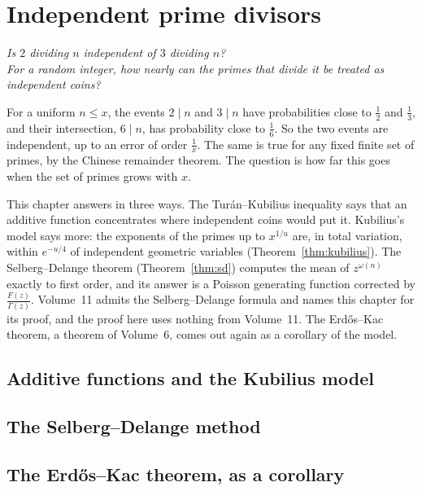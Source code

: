 \chapter{Independent prime divisors}\label{ch:oc-divisors}\label{ch:additive}\label{ch:sd}\label{ch:erdoskac}

\begin{center}\itshape
Is $2$ dividing $n$ independent of $3$ dividing $n$?\\
For a random integer, how nearly can the primes that divide it be treated as independent coins?
\end{center}

For a uniform $n\le x$, the events $2\mid n$ and $3\mid n$ have probabilities close to $\frac12$ and $\frac13$, and their intersection, $6\mid n$, has probability close to $\frac16$. So the two events are independent, up to an error of order $\frac1x$. The same is true for any fixed finite set of primes, by the Chinese remainder theorem. The question is how far this goes when the set of primes grows with $x$.

This chapter answers in three ways. The Tur\'an--Kubilius inequality says that an additive function concentrates where independent coins would put it. Kubilius's model says more: the exponents of the primes up to $x^{1/u}$ are, in total variation, within $e^{-u/4}$ of independent geometric variables (Theorem~\ref{thm:kubilius}). The Selberg--Delange theorem (Theorem~\ref{thm:sd}) computes the mean of $z^{\omega(n)}$ exactly to first order, and its answer is a Poisson generating function corrected by $\frac{F(z)}{\Gamma(z)}$. Volume~11 admits the Selberg--Delange formula and names this chapter for its proof, and the proof here uses nothing from Volume~11. The Erd\H{o}s--Kac theorem, a theorem of Volume~6, comes out again as a corollary of the model.

\section{Additive functions and the Kubilius model}



\section{The Selberg--Delange method}



\section{The Erd\H{o}s--Kac theorem, as a corollary}

